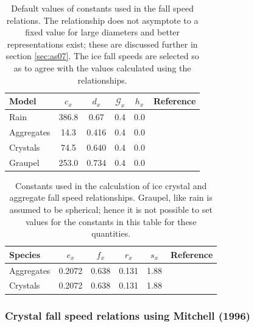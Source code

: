 \documentclass{UMDP_article}
\begin{document}
\begin{table}[ht!]
\begin{center}
\begin{tabular}{lccccl}
\hline
Model              & {$c_x$} & {$d_x$} & {$\mathcal{G}_x$} & {$h_x$}  & Reference
\\   \hline
Rain       & 386.8   &  0.67   & 0.4     &  0.0     
& \cite{Sachidananda:Zrnic:1986} \\   \hline
Aggregates & 14.3    & 0.416   & 0.4     &  0.0     
& \cite{Mitchell:1996}          \\   \hline
Crystals   & 74.5    & 0.640   & 0.4     &  0.0     
& \cite{Mitchell:1996}  \\ \hline
Graupel    & 253.0   & 0.734   & 0.4     &  0.0
& \cite{Ferrier:1994}   \\   \hline
\end{tabular}
\end{center}
\caption{Default values of constants used in the fall speed relations. The 
\cite{Sachidananda:Zrnic:1986} relationship does not asymptote to a fixed value 
for large diameters and better representations exist; these are discussed 
further in section \ref{sec:as07}. 
The ice fall speeds are selected so as to agree with the values calculated 
using the \cite{Mitchell:1996} relationships.}
\label{tab:mic_consts_fallspeed}
\end{table}

\begin{table}[ht!]
\begin{center}
\begin{tabular}{lccccl}
\hline
Species              & {$e_x$} & {$f_x$} & {$r_x$} & {$s_x$} & Reference       \\   
\hline
Aggregates         &  0.2072 &  0.638  & 0.131   & 1.88    &\cite{Mitchell:1996}\\
\hline
Crystals           &  0.2072 &  0.638  & 0.131   & 1.88    &\cite{Mitchell:1996}\\
\hline
\end{tabular}
\end{center}
\caption{Constants used in the calculation of ice crystal and aggregate 
fall speed relationships. Graupel, like rain is assumed to be spherical; 
hence it is not possible to set values for the constants in this table for 
these quantities.}
\label{tab:mic_consts_fallspeed2}
\end{table}

\subsubsection{Crystal fall speed relations using Mitchell (1996)}
\label{sec:mit_2nd_rex}
\end{document}
